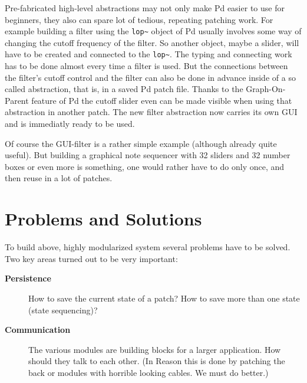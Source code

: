 \documentclass[10pt,english]{scrartcl}
\begin{document}
Pre-fabricated high-level abstractions may not only make Pd easier to use
for beginners, they also can spare lot of tedious, repeating patching work.
For example building a filter using the \texttt{lop{\~{ }}} object of Pd usually
involves some way of changing the cutoff frequency of the filter. So another
object, maybe a slider, will have to be created and connected to the
\texttt{lop{\~{ }}}. The typing and connecting work has to be done almost every time a
filter is used. But the connections between the filter's cutoff control and
the filter can also be done in advance inside of a so called abstraction,
that is, in a saved Pd patch file. Thanks to the Graph-On-Parent feature of
Pd the cutoff slider even can be made visible when using that abstraction in
another patch. The new filter abstraction now carries its own GUI and is
immediatly ready to be used.

Of course the GUI-filter is a rather simple example (although already quite
useful). But building a graphical note sequencer with 32 sliders and 32
number boxes or even more is something, one would rather have to do only
once, and then reuse in a lot of patches.



\hypertarget{problems-and-solutions}{}
\section*{Problems and Solutions}

To build above, highly modularized system several problems have to be
solved. Two key areas turned out to be very important:
\begin{description}
\item[\textbf{Persistence}]

How to save the current state of a patch? How to save more than one
state (state sequencing)?

\item[\textbf{Communication}]

The various modules are building blocks for a larger application. How
should they talk to each other. (In Reason this is done by patching the
back or modules with horrible looking cables. We must do better.)

\end{description}
\end{document}

